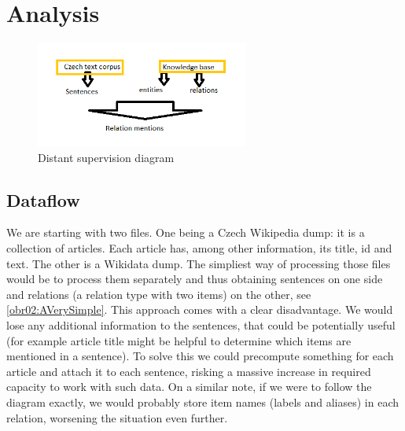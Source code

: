 \section{Analysis}

\begin{figure}[h]\centering
\includegraphics[width=70mm]{./img/Distant}
\caption{Distant supervision diagram}
\label{obr03:Nhust}
\end{figure}

\subsection{Dataflow}

We are starting with two files. One being a Czech Wikipedia dump: it is a collection of articles. Each article has, among other information, its title, id and text. The other is a Wikidata dump. The simpliest way of processing those files would be to process them separately and thus obtaining sentences on one side and relations (a relation type with two items) on the other, see \ref{obr02:AVerySimple}. This approach comes with a clear disadvantage. We would lose any additional information to the sentences, that could be potentially useful (for example article title might be helpful to determine which items are mentioned in a sentence). To solve this we could precompute something for each article and attach it to each sentence, risking a massive increase in required capacity to work with such data. On a similar note, if we were to follow the diagram exactly, we would probably store item names (labels and aliases) in each relation, worsening the situation even further.


